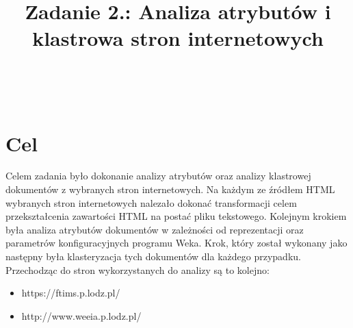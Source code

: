\documentclass{classrep}
\author{%
    \studentinfo[239671@edu.p.lodz.pl]{Jan Karwowski}{239671}\\
    \studentinfo[239676@edu.p.lodz.pl]{Kamil Kowalewski}{239676}\\
}
\title{Zadanie 2.: Analiza atrybutów i klastrowa stron internetowych}
\begin{document}
    \maketitle
    \thispagestyle{fancyplain}

    \tableofcontents
    \newpage

    \section{Cel}
    \label{purpose} {
        Celem zadania było dokonanie analizy atrybutów oraz analizy klastrowej dokumentów
        z wybranych stron internetowych. Na każdym ze źródłem HTML wybranych stron
        internetowych nalezało dokonać transformacji celem przekształcenia zawartości
        HTML na postać pliku tekstowego. Kolejnym krokiem była analiza atrybutów
        dokumentów w zależności od reprezentacji oraz parametrów konfiguracyjnych
        programu Weka\cite{weka}. Krok, który został wykonany jako następny była
        klasteryzacja tych dokumentów dla każdego przypadku. Przechodząc do stron
        wykorzystanych do analizy są to kolejno:

        \begin{itemize}
            \item https://ftims.p.lodz.pl/
            \item http://www.weeia.p.lodz.pl/
        \end{itemize}
    }
\end{document}
